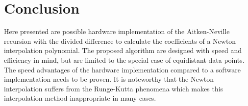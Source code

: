 \section{Conclusion}

Here presented are possible hardware implementation of the Aitken-Neville
recursion with the divided difference to calculate the coefficients of a
Newton interpolation polynomial. The proposed algorithm are designed with
speed and efficiency in mind, but are limited to the special case of
equidistant data points. The speed advantages of the hardware implementation
compared to a software implementation needs to be proven. It is noteworthy
that the Newton interpolation suffers from the Runge-Kutta phenomena which
makes this interpolation method inappropriate in many cases.
